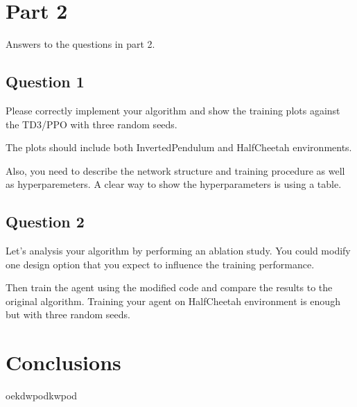 \documentclass[12pt]{article}
\begin{document}
\pagebreak



\section*{Part 2}

Answers to the questions in part 2.
\newline

\subsection*{Question 1}

\noindent
Please correctly implement your algorithm and show the training plots against the TD3/PPO
with three random seeds. 
\newline

\noindent
The plots should include both InvertedPendulum and HalfCheetah environments. 
\newline

\noindent
Also, you need to describe the network structure and training procedure as well
as hyperparemeters. A clear way to show the hyperparameters is using a table.

\subsection*{Question 2}

\noindent
Let’s analysis your algorithm by performing an ablation study. You could modify one design
option that you expect to influence the training performance. 
\newline

\noindent
Then train the agent using the modified code and compare the results to the original algorithm. Training your agent on HalfCheetah environment is enough but with three random seeds.




\section*{Conclusions}

oekdwpodkwpod
\noindent


\pagebreak


\end{document}

